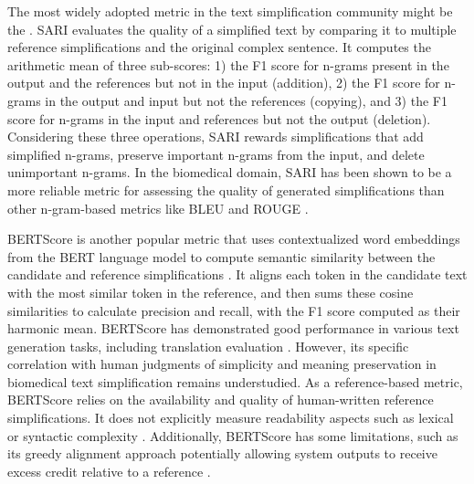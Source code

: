 The most widely adopted metric in the text simplification community might be the  \cite{xu-etal-2016-optimizing}. 
SARI evaluates the quality of a simplified text by comparing it to multiple reference simplifications and the original complex sentence. 
It computes the arithmetic mean of three sub-scores: 1) the F1 score for n-grams present in the output and the references but not in the input (addition), 2) the F1 score for n-grams in the output and input but not the references (copying), and 3) the F1 score for n-grams in the input and references but not the output (deletion). 
Considering these three operations, SARI rewards simplifications that add simplified n-grams, preserve important n-grams from the input, and delete unimportant n-grams. 
In the biomedical domain, SARI has been shown to be a more reliable metric for assessing the quality of generated simplifications than other n-gram-based metrics like BLEU and ROUGE \cite{li2024largelanguagemodelsbiomedical}.

BERTScore is another popular metric that uses contextualized word embeddings from the BERT language model to compute semantic similarity between the candidate and reference simplifications \cite{zhang2020bertscoreevaluatingtextgeneration}.
It aligns each token in the candidate text with the most similar token in the reference, and then sums these cosine similarities to calculate precision and recall, with the F1 score computed as their harmonic mean.
BERTScore has demonstrated good performance in various text generation tasks, including translation evaluation \cite{Vetrov2022ANA, Tang2024ImprovingBF}. However, its specific correlation with human judgments of simplicity and meaning preservation in biomedical text simplification remains understudied.
As a reference-based metric, BERTScore relies on the availability and quality of human-written reference simplifications. It does not explicitly measure readability aspects such as lexical or syntactic complexity \cite{li2024largelanguagemodelsbiomedical}. 
Additionally, BERTScore has some limitations, such as its greedy alignment approach potentially allowing system outputs to receive excess credit relative to a reference \cite{jin-gildea-2022-rewarding}.

